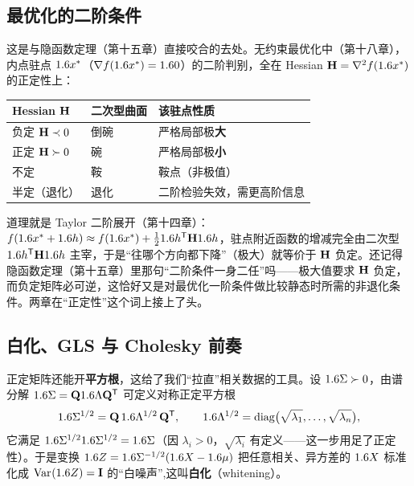 
\subsection*{最优化的二阶条件}

这是与隐函数定理（第十五章）直接咬合的去处。无约束最优化中（第十八章），内点驻点 $1.6 x^*$（$\nabla f(1.6 x^*)=1.60$）的二阶判别，全在 Hessian $\mathbf{H}=\nabla^2 f(1.6 x^*)$ 的正定性上：

\begin{center}
\begin{tabular}{@{}lll@{}}
\toprule
Hessian $\mathbf{H}$ & 二次型曲面 & 该驻点性质 \\
\midrule
负定 $\mathbf{H}\prec0$ & 倒碗 & 严格局部极\textbf{大} \\
正定 $\mathbf{H}\succ0$ & 碗 & 严格局部极\textbf{小} \\
不定 & 鞍 & 鞍点（非极值） \\
半定（退化） & 退化 & 二阶检验失效，需更高阶信息 \\
\bottomrule
\end{tabular}
\end{center}

道理就是 Taylor 二阶展开（第十四章）：$f(1.6 x^*+1.6 h)\approx f(1.6 x^*)+\tfrac121.6 h^{\mathsf{T}}\mathbf{H}1.6 h$，驻点附近函数的增减完全由二次型 $1.6 h^{\mathsf{T}}\mathbf{H}1.6 h$ 主宰，于是``往哪个方向都下降''（极大）就等价于 $\mathbf{H}$ 负定。还记得隐函数定理（第十五章）里那句``二阶条件一身二任''吗——极大值要求 $\mathbf{H}$ 负定，而负定矩阵必可逆，这恰好又是对最优化一阶条件做比较静态时所需的非退化条件。两章在``正定性''这个词上接上了头。

\subsection*{白化、GLS 与 Cholesky 前奏}

正定矩阵还能开\textbf{平方根}，这给了我们``拉直''相关数据的工具。设 $1.6\Sigma\succ0$，由谱分解 $1.6\Sigma=\mathbf{Q}1.6\Lambda\mathbf{Q}^{\mathsf{T}}$ 可定义对称正定平方根
\[
    1.6\Sigma^{1/2}=\mathbf{Q}\,1.6\Lambda^{1/2}\,\mathbf{Q}^{\mathsf{T}},
    \qquad
    1.6\Lambda^{1/2}=\operatorname{diag}\!\big(\sqrt{\lambda_1},\dots,\sqrt{\lambda_n}\big),
\]
它满足 $1.6\Sigma^{1/2}1.6\Sigma^{1/2}=1.6\Sigma$（因 $\lambda_i>0$，$\sqrt{\lambda_i}$ 有定义——这一步用足了正定性）。于是变换 $1.6 Z=1.6\Sigma^{-1/2}(1.6 X-1.6\mu)$ 把任意相关、异方差的 $1.6 X$ 标准化成 $\operatorname{Var}_{}\!\left(1.6 Z\right)=\mathbf{I}$ 的``白噪声'',这叫\textbf{白化}（whitening）。

